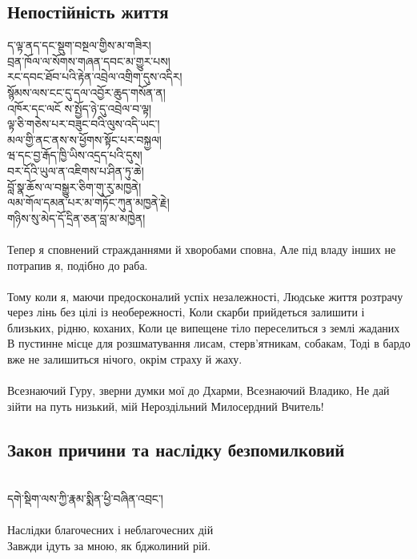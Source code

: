 \subsection{Непостійність життя}
\ti
ད་ལྟ་ནད་དང་སྡུག་བསྔལ་གྱིས་མ་གཟིར།\\
བྲན་ཁོལ་ལ་སོགས་གཞན་དབང་མ་གྱུར་པས།\\
རང་དབང་ཐོབ་པའི་རྟེན་འབྲེལ་འགྲིག་དུས་འདིར།\\
སྙོམས་ལས་ངང་དུ་དལ་འབྱོར་ཆུད་གསོན་ན།\\
འཁོར་དང་ལངོ ས་སྤྱོད་ཉེ་དུ་འབྲེལ་བ་ལྟ།\\
ལྟ་ཅི་གཅེས་པར་བཟུང་བའི་ལུས་འདི་ཡང་།\\
མལ་གྱི་ནང་ནས་ས་ཕྱོགས་སྟོང་པར་བསྐྱལ།\\
ཝ་དང་བྱ་རྒོད་ཁྱི་ཡིས་འདྲད་པའི་དུས།\\
བར་དོའི་ཡུལ་ན་འཇིགས་པ་ཤིན་ཏུ་ཆེ།\\
བློ་སྣ་ཆོས་ལ་བསྒྱུར་ཅིག་གུ་རུ་མཁྱནེ།\\
ལམ་གོལ་དམན་པར་མ་གཏོང་ཀུན་མཁྱནེ་རྗེ།\\
གཉིས་སུ་མེད་དོ་དྲིན་ཅན་བླ་མ་མཁྱེན།\\
\\
\ru
Тепер я сповнений стражданнями й хворобами сповна,
Але під владу інших не потрапив я, подібно до раба.\\
\\
Тому коли я, маючи предосконалий успіх незалежності,
Людське життя розтрачу через лінь без цілі із необережності,
Коли скарби прийдеться залишити і близьких, рідню, коханих,
Коли це випещене тіло переселиться з землі жаданих
В пустинне місце для розшматування лисам, стерв'ятникам, собакам,
Тоді в бардо вже не залишиться нічого, окрім страху й жаху.\\
\\
Всезнаючий Гуру, зверни думки мої до Дхарми, Всезнаючий Владико,
Не дай зійти на путь низький, мій Нероздільний Милосердний Вчитель!\\

\newpage
\subsection{Закон причини та наслідку безпомилковий}
\\
\ti
དགེ་སྡིག་ལས་ཀྱི་རྣམ་སྨིན་ཕྱི་བཞིན་འབྲང་།\\
\\
\ru
Наслідки благочесних і неблагочесних дій\\
Завжди ідуть за мною, як бджолиний рій.\\

